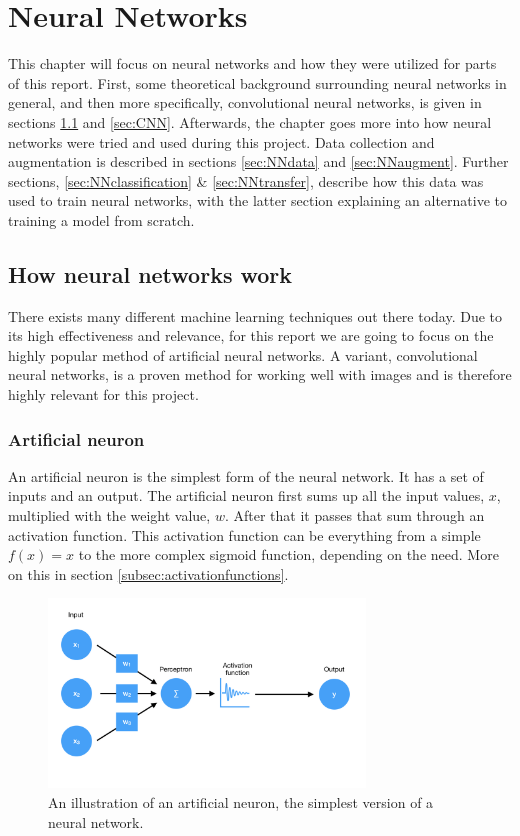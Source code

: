 \chapter{Neural Networks}
This chapter will focus on neural networks and how they were utilized for parts of this
report. First, some theoretical background surrounding neural networks in general, and then
more specifically, convolutional neural networks, is given in sections \ref{sec:NNwork}
and \ref{sec:CNN}.
Afterwards, the chapter goes more into how neural networks were tried and used during this project. Data collection and augmentation is described in sections \ref{sec:NNdata} and \ref{sec:NNaugment}. Further sections, \ref{sec:NNclassification} \& \ref{sec:NNtransfer}, describe how this data was used to train neural networks, with the latter section explaining an alternative to training a model from scratch. 
\section{How neural networks work}
\label{sec:NNwork}
There exists many different machine learning techniques out there today. Due to its high 
effectiveness and relevance, for this report we are going to focus on the highly popular 
method of artificial neural networks.
A variant, convolutional neural networks, is a proven method for working well with 
images and is therefore highly relevant for this project.

\subsection{Artificial neuron}
An artificial neuron is the simplest form of the neural network. It has a set of inputs and an output.
The artificial neuron first sums up all the input values, $x$, multiplied with the weight value, $w$.
After that it passes that sum through an activation function. This activation function can be everything from a simple $f(x)=x$ to the more complex sigmoid function, depending on the need. More on this in section \ref{subsec:activationfunctions}.

\begin{figure}[hbtp]
\begin{center}
\includegraphics[width = 0.75\textwidth]{./Images/perceptron.jpg} 
\caption{An illustration of an artificial neuron, the simplest version of a neural network.}
\end{center}
\end{figure}

